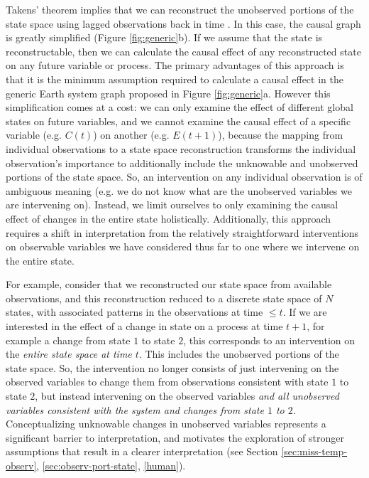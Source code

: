 \documentclass[12pt]{article}
\begin{document}
Takens' theorem implies that we can reconstruct the unobserved
portions of the state space using lagged observations back in time
\citep{takens1981detecting,deyle2011generalized,Sugihara496}. In this
case, the causal graph is greatly simplified (Figure
\ref{fig:generic}b). If we assume that the state is reconstructable,
then we can calculate the causal effect of any reconstructed state on
any future variable or process. The primary advantages of this
approach is that it is the minimum assumption required to calculate a
causal effect in the generic Earth system graph proposed in Figure
\ref{fig:generic}a. However this simplification comes at a cost: we
can only examine the effect of different global states on future
variables, and we cannot examine the causal effect of a specific
variable (e.g. $C(t)$) on another (e.g. $E(t+1)$), because the mapping
from individual observations to a state space reconstruction
transforms the individual observation's importance to additionally
include the unknowable and unobserved portions of the state space. So,
an intervention on any individual observation is of ambiguous meaning
(e.g. we do not know what are the unobserved variables we are
intervening on). Instead, we limit ourselves to only examining the
causal effect of changes in the entire state
holistically. Additionally, this approach requires a shift in
interpretation from the relatively straightforward interventions on
observable variables we have considered thus far to one where we
intervene on the entire state.

For example, consider that we reconstructed our state space from
available observations, and this reconstruction reduced to a discrete
state space of $N$ states, with associated patterns in the observations
at time $\leq t$. If we are interested in the effect of a change in
state on a process at time $t+1$, for example a change from state $1$
to state $2$, this corresponds to an intervention on the
\textit{entire state space at time $t$}. This includes the unobserved
portions of the state space. So, the intervention no longer consists
of just intervening on the observed variables to change them from
observations consistent with state $1$ to state $2$, but instead
intervening on the observed variables \emph{and all unobserved
  variables consistent with the system and changes from state $1$ to
  $2$.}  Conceptualizing unknowable changes in unobserved variables
represents a significant barrier to interpretation, and motivates the
exploration of stronger assumptions that result in a clearer
interpretation (see Section \ref{sec:miss-temp-observ},
\ref{sec:observ-port-state}, \ref{human}).
\end{document}

